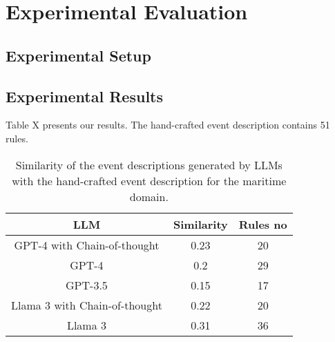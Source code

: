 \section{Experimental Evaluation}\label{sec:experiments}

\subsection{Experimental Setup}\label{sec:setup}

\subsection{Experimental Results}\label{sec:results}

Table X presents our results. The hand-crafted event description contains 51 rules.

\begin{table}
\centering
\begin{tabular}{ccc}
\toprule
LLM & Similarity & Rules no \\
\midrule
GPT-4 with Chain-of-thought & 0.23 & 20 \\
GPT-4 & 0.2 & 29 \\
GPT-3.5 & 0.15 & 17 \\
Llama 3 with Chain-of-thought & 0.22 & 20 \\
Llama 3 & 0.31 & 36 \\
\bottomrule
\end{tabular}
\caption{Similarity of the event descriptions generated by LLMs with the hand-crafted event description for the maritime domain.}
\label{tbl:similarity}
\end{table}
